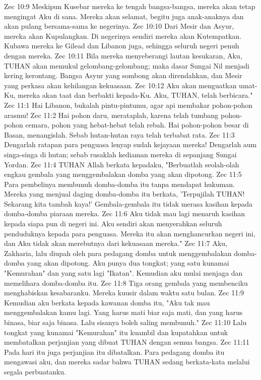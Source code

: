 Zec 10:9  Meskipun Kusebar mereka ke tengah bangsa-bangsa, mereka akan tetap mengingat Aku di sana. Mereka akan selamat, begitu juga anak-anaknya dan akan pulang bersama-sama ke negerinya.
Zec 10:10  Dari Mesir dan Asyur, mereka akan Kupulangkan. Di negerinya sendiri mereka akan Kutempatkan. Kubawa mereka ke Gilead dan Libanon juga, sehingga seluruh negeri penuh dengan mereka.
Zec 10:11  Bila mereka menyeberangi lautan kesukaran, Aku, TUHAN akan memukul gelombang-gelombang; maka dasar Sungai Nil menjadi kering kerontang. Bangsa Asyur yang sombong akan direndahkan, dan Mesir yang perkasa akan kehilangan kekuasaan.
Zec 10:12  Aku akan menguatkan umat-Ku, mereka akan taat dan berbakti kepada-Ku. Aku, TUHAN, telah berbicara."
Zec 11:1  Hai Libanon, bukalah pintu-pintumu, agar api membakar pohon-pohon arasmu!
Zec 11:2  Hai pohon daru, merataplah, karena telah tumbang pohon-pohon cemara, pohon yang hebat-hebat telah rebah. Hai pohon-pohon besar di Basan, menangislah. Sebab hutan-hutan raya telah terbabat rata.
Zec 11:3  Dengarlah ratapan para penguasa lenyap sudah kejayaan mereka! Dengarlah aum singa-singa di hutan; sebab rusaklah kediaman mereka di sepanjang Sungai Yordan.
Zec 11:4  TUHAN Allah berkata kepadaku, "Berbuatlah seolah-olah engkau gembala yang menggembalakan domba yang akan dipotong.
Zec 11:5  Para pembelinya membunuh domba-domba itu tanpa mendapat hukuman. Mereka yang menjual daging domba-domba itu berkata, 'Terpujilah TUHAN! Sekarang kita tambah kaya!' Gembala-gembala itu tidak merasa kasihan kepada domba-domba piaraan mereka.
Zec 11:6  Aku tidak mau lagi menaruh kasihan kepada siapa pun di negeri ini. Aku sendiri akan menyerahkan seluruh penduduknya kepada para penguasa. Mereka itu akan menghancurkan negeri ini, dan Aku tidak akan merebutnya dari kekuasaan mereka."
Zec 11:7  Aku, Zakharia, lalu diupah oleh para pedagang domba untuk menggembalakan domba-domba yang akan dipotong. Aku punya dua tongkat; yang satu kunamai "Kemurahan" dan yang satu lagi "Ikatan". Kemudian aku mulai menjaga dan memelihara domba-domba itu.
Zec 11:8  Tiga orang gembala yang membenciku menghabiskan kesabaranku. Mereka kuusir dalam waktu satu bulan.
Zec 11:9  Kemudian aku berkata kepada kawanan domba itu, "Aku tak mau menggembalakan kamu lagi. Yang harus mati biar saja mati, dan yang harus binasa, biar saja binasa. Lalu sisanya boleh saling membunuh."
Zec 11:10  Lalu tongkat yang kunamai "Kemurahan" itu kuambil dan kupatahkan untuk membatalkan perjanjian yang dibuat TUHAN dengan semua bangsa.
Zec 11:11  Pada hari itu juga perjanjian itu dibatalkan. Para pedagang domba itu mengawasi aku, dan mereka sadar bahwa TUHAN sedang berkata-kata melalui segala perbuatanku.
